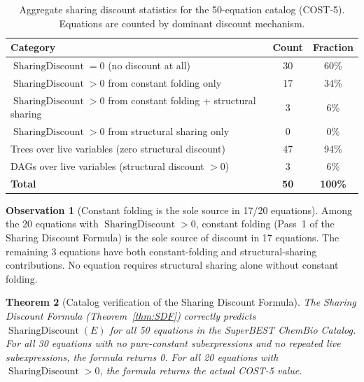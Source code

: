 \documentclass[12pt,a4paper]{article}
\newtheorem{theorem}{Theorem}[section]
\theoremstyle{definition}
\newtheorem{observation}[theorem]{Observation}
\newcommand{\SD}{\operatorname{SharingDiscount}}
\begin{document}
\begin{table}[h]
\centering
\caption{Aggregate sharing discount statistics for the 50-equation catalog
         (COST-5).  Equations are counted by dominant discount mechanism.}
\label{tab:agg}
\smallskip
\begin{tabular}{@{}lcc@{}}
\toprule
\textbf{Category} & \textbf{Count} & \textbf{Fraction} \\
\midrule
$\SD = 0$ (no discount at all)            & 30 & 60\% \\
$\SD > 0$ from constant folding only      & 17 & 34\% \\
$\SD > 0$ from constant folding + structural sharing & 3 & 6\% \\
$\SD > 0$ from structural sharing only    &  0 & 0\% \\
\midrule
Trees over live variables (zero structural discount)  & 47 & 94\% \\
DAGs over live variables (structural discount $> 0$)  &  3 & 6\% \\
\midrule
\textbf{Total}                            & \textbf{50} & \textbf{100\%} \\
\bottomrule
\end{tabular}
\end{table}

\begin{observation}[Constant folding is the sole source in 17/20 equations]
\label{obs:cf-dominant}
Among the 20 equations with $\SD > 0$, constant folding (Pass~1 of the
Sharing Discount Formula) is the sole source of discount in 17 equations.
The remaining 3 equations have both constant-folding and structural-sharing
contributions.  No equation requires structural sharing alone without
constant folding.
\end{observation}

\begin{theorem}[Catalog verification of the Sharing Discount Formula]
\label{thm:verify}
The Sharing Discount Formula (Theorem~\ref{thm:SDF}) correctly predicts
$\SD(E)$ for all 50 equations in the SuperBEST ChemBio Catalog.  For all
30 equations with no pure-constant subexpressions and no repeated live
subexpressions, the formula returns 0.  For all 20 equations with $\SD > 0$,
the formula returns the actual COST-5 value.
\end{theorem}
\end{document}
